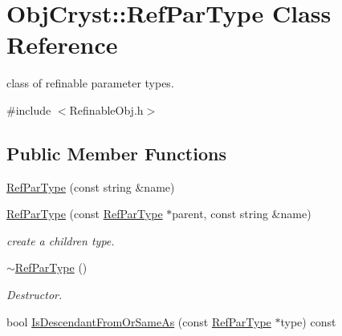 \hypertarget{class_obj_cryst_1_1_ref_par_type}{}\section{Obj\+Cryst\+::Ref\+Par\+Type Class Reference}
\label{class_obj_cryst_1_1_ref_par_type}


class of refinable parameter types.  




{\ttfamily \#include $<$Refinable\+Obj.\+h$>$}

\subsection*{Public Member Functions}
\begin{DoxyCompactItemize}
\item 
\mbox{\hyperlink{class_obj_cryst_1_1_ref_par_type_a31d4f6797fa0a4b43d12203f89dbdb5c}{Ref\+Par\+Type}} (const string \&name)
\item 
\mbox{\label{class_obj_cryst_1_1_ref_par_type_a390f7a24ccff7cc557a26f7b2a120566}} 
\mbox{\hyperlink{class_obj_cryst_1_1_ref_par_type_a390f7a24ccff7cc557a26f7b2a120566}{Ref\+Par\+Type}} (const \mbox{\hyperlink{class_obj_cryst_1_1_ref_par_type}{Ref\+Par\+Type}} $\ast$parent, const string \&name)
\begin{DoxyCompactList}\small\item\em create a children type. \end{DoxyCompactList}\item 
\mbox{\label{class_obj_cryst_1_1_ref_par_type_a46519355b2de6a3f1a0f32c3b3c5a84d}} 
\mbox{\hyperlink{class_obj_cryst_1_1_ref_par_type_a46519355b2de6a3f1a0f32c3b3c5a84d}{$\sim$\+Ref\+Par\+Type}} ()
\begin{DoxyCompactList}\small\item\em Destructor. \end{DoxyCompactList}\item 
\mbox{\label{class_obj_cryst_1_1_ref_par_type_ac97be763ec8c07fdcffa0e35744a9371}} 
bool \mbox{\hyperlink{class_obj_cryst_1_1_ref_par_type_ac97be763ec8c07fdcffa0e35744a9371}{Is\+Descendant\+From\+Or\+Same\+As}} (const \mbox{\hyperlink{class_obj_cryst_1_1_ref_par_type}{Ref\+Par\+Type}} $\ast$type) const

\end{DoxyCompactItemize}
